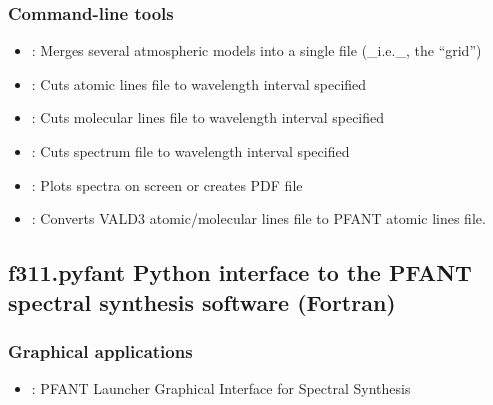 \documentclass[letterpaper,10pt,english]{sphinxmanual}
\begin{document}
\subsubsection{Command-line tools}
\label{\detokenize{intro:id4}}\begin{itemize}
\item {} 
{\hyperref[\detokenize{autoscripts/script-create-grid::doc}]{}}: Merges several atmospheric models into a single file (\_i.e.\_, the “grid”)

\item {} 
{\hyperref[\detokenize{autoscripts/script-cut-atoms::doc}]{}}: Cuts atomic lines file to wavelength interval specified

\item {} 
{\hyperref[\detokenize{autoscripts/script-cut-molecules::doc}]{}}: Cuts molecular lines file to wavelength interval specified

\item {} 
{\hyperref[\detokenize{autoscripts/script-cut-spectrum::doc}]{}}: Cuts spectrum file to wavelength interval specified

\item {} 
{\hyperref[\detokenize{autoscripts/script-plot-spectra::doc}]{}}: Plots spectra on screen or creates PDF file

\item {} 
{\hyperref[\detokenize{autoscripts/script-vald3-to-atoms::doc}]{}}: Converts VALD3 atomic/molecular lines file to PFANT atomic lines file.

\end{itemize}


\subsection{f311.pyfant \textendash{} Python interface to the PFANT spectral synthesis software (Fortran)}
\label{\detokenize{intro:f311-pyfant-python-interface-to-the-pfant-spectral-synthesis-software-fortran}}

\subsubsection{Graphical applications}
\label{\detokenize{intro:id5}}\begin{itemize}
\item {} 
{\hyperref[\detokenize{autoscripts/script-x::doc}]{}}: PFANT Launcher \textendash{} Graphical Interface for Spectral Synthesis

\end{itemize}
\end{document}
